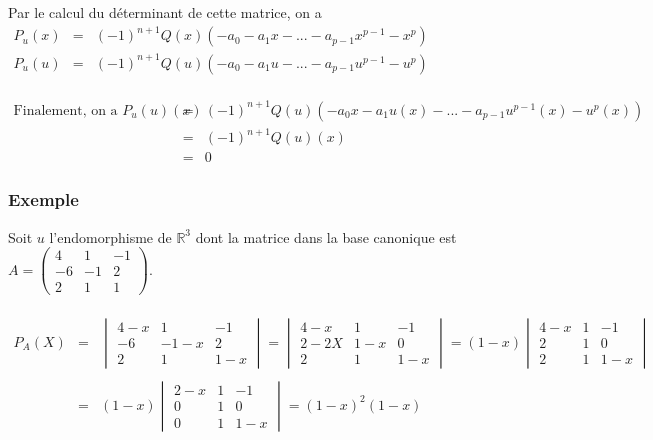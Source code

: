 \documentclass[a4paper,10pt]{book} %
\newcommand{\R}{\mathbb{R}}
\begin{document}
Par le calcul du déterminant de cette matrice, on a
$\begin{array}{lll}
P_u(x)&=&(-1)^{n+1}Q(x)(-a_0-a_1x-...-a_{p-1}x^{p-1}-x^p)\\
P_u(u)&=&(-1)^{n+1}Q(u)(-a_0-a_1u-...-a_{p-1}u^{p-1}-u^p)
\end{array}$\\\\

$\begin{array}{lll}
\text{Finalement, on a }P_u(u)(x)&=&(-1)^{n+1}Q(u)(-a_0x-a_1u(x)-...-a_{p-1}u^{p-1}(x)-u^p(x))\\
&=&(-1)^{n+1}Q(u)(x)\\
&=&0
\end{array}$

\newpage

\subsubsection{Exemple}
Soit $u$ l'endomorphisme de $\R^3$ dont la matrice dans la base canonique est $A=\begin{pmatrix}
4&1&-1\\-6&-1&2\\2&1&1
\end{pmatrix}$.\\\\

$\begin{array}{rcl}P_A(X)&=&\begin{vmatrix}
4-x&1&-1\\-6&-1-x&2\\2&1&1-x
\end{vmatrix}=\begin{vmatrix}
4-x&1&-1\\2-2X&1-x&0\\2&1&1-x
\end{vmatrix}=(1-x)\begin{vmatrix}
4-x&1&-1\\2&1&0\\2&1&1-x
\end{vmatrix}\\\\
&=&(1-x)\begin{vmatrix}
2-x&1&-1\\0&1&0\\0&1&1-x
\end{vmatrix}=(1-x)^2(1-x)\end{array}$\\\\
\end{document}
